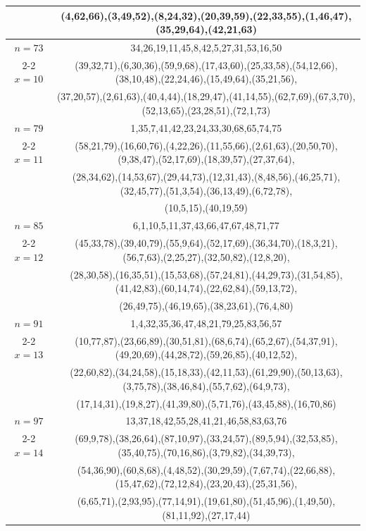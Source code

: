 \begin{tabular}{| c | c |}
&(4,62,66),(3,49,52),(8,24,32),(20,39,59),(22,33,55),(1,46,47),(35,29,64),(42,21,63)\\
\hline 
\(n=73\) & 
34,26,19,11,45,8,42,5,27,31,53,16,50\\
\cline{2-2}
\(x=10\)
&(39,32,71),(6,30,36),(59,9,68),(17,43,60),(25,33,58),(54,12,66),(38,10,48),(22,24,46),(15,49,64),(35,21,56),\\
&(37,20,57),(2,61,63),(40,4,44),(18,29,47),(41,14,55),(62,7,69),(67,3,70),(52,13,65),(23,28,51),(72,1,73)\\
\hline 
\(n=79\) & 
1,35,7,41,42,23,24,33,30,68,65,74,75\\
\cline{2-2}
\(x=11\)
&(58,21,79),(16,60,76),(4,22,26),(11,55,66),(2,61,63),(20,50,70),(9,38,47),(52,17,69),(18,39,57),(27,37,64),\\
&(28,34,62),(14,53,67),(29,44,73),(12,31,43),(8,48,56),(46,25,71),(32,45,77),(51,3,54),(36,13,49),(6,72,78),\\
&(10,5,15),(40,19,59)\\
\hline 
\(n=85\) & 
6,1,10,5,11,37,43,66,47,67,48,71,77\\
\cline{2-2}
\(x=12\)
&(45,33,78),(39,40,79),(55,9,64),(52,17,69),(36,34,70),(18,3,21),(56,7,63),(2,25,27),(32,50,82),(12,8,20),\\
&(28,30,58),(16,35,51),(15,53,68),(57,24,81),(44,29,73),(31,54,85),(41,42,83),(60,14,74),(22,62,84),(59,13,72),\\
&(26,49,75),(46,19,65),(38,23,61),(76,4,80)\\
\hline 
\(n=91\) & 
1,4,32,35,36,47,48,21,79,25,83,56,57\\
\cline{2-2}
\(x=13\)
&(10,77,87),(23,66,89),(30,51,81),(68,6,74),(65,2,67),(54,37,91),(49,20,69),(44,28,72),(59,26,85),(40,12,52),\\
&(22,60,82),(34,24,58),(15,18,33),(42,11,53),(61,29,90),(50,13,63),(3,75,78),(38,46,84),(55,7,62),(64,9,73),\\
&(17,14,31),(19,8,27),(41,39,80),(5,71,76),(43,45,88),(16,70,86)\\
\hline 
\(n=97\) & 
13,37,18,42,55,28,41,21,46,58,83,63,76\\
\cline{2-2}
\(x=14\)
&(69,9,78),(38,26,64),(87,10,97),(33,24,57),(89,5,94),(32,53,85),(35,40,75),(70,16,86),(3,79,82),(34,39,73),\\
&(54,36,90),(60,8,68),(4,48,52),(30,29,59),(7,67,74),(22,66,88),(15,47,62),(72,12,84),(23,20,43),(25,31,56),\\
&(6,65,71),(2,93,95),(77,14,91),(19,61,80),(51,45,96),(1,49,50),(81,11,92),(27,17,44)\\

\end{tabular}
